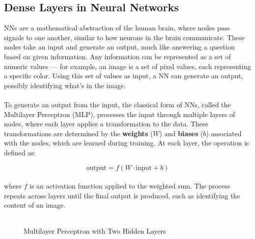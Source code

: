 \subsection{Dense Layers in Neural Networks}
\label{subsec:subsection1}
NNs are a mathematical abstraction of the human brain, where nodes pass signals to one another, 
similar to how neurons in the brain communicate. These nodes take an input and generate an output, 
much like answering a question based on given information. Any information can be represented as a set of numeric values — 
for example, an image is a set of pixel values, each representing a specific color. Using this set of values as input, 
a NN can generate an output, possibly identifying what's in the image.
\\
\\
To generate an output from the input, the classical form of NNs, called the Multilayer Perceptron (MLP), 
processes the input through multiple layers of nodes, where each layer applies a transformation to the data. 
These transformations are determined by the \textbf{weights} (\( W \)) and \textbf{biases} (\( b \)) 
associated with the nodes, which are learned during training. At each layer, the operation is defined as:

\[
\text{output} = f(W \cdot \text{input} + b)
\]
\\
\noindent where \( f \) is an activation function applied to the weighted sum. The process repeats across layers until the final output is produced,
such as identifying the content of an image.
\\
\\

\begin{figure}[h!]
  \centering
  \caption{Multilayer Perceptron with Two Hidden Layers}
  \label{fig:mlp_diagram}
\end{figure}


